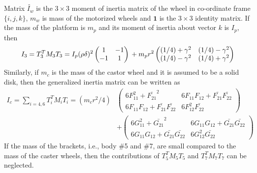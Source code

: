 Matrix $\tilde{I_w}$ is the $3\times 3$ moment of inertia matrix of the wheel in co-ordinate frame $\{i,j,k\}$, $m_w$ is mass of the motorized wheels    and $\bm{1}$ is the $3\times 3$ identity matrix. If the mass of the platform is $m_p$ and its moment of inertia about vector ${k}$ is $I_p$, then  \cite{angeles2013fundamentals} 
\begin{equation}
\label{eqn:I_platform}
I_3=T^T_3M_3T_3 =I_p(\rho\delta)^2\begin{pmatrix}
1&-1\\-1&1 \end{pmatrix}\\
+m_pr^2\begin{pmatrix}
(1/4)+\gamma^2 & (1/4)-\gamma^2\\(1/4)-\gamma^2 & (1/4)+\gamma^2
\end{pmatrix}
\end{equation}
Similarly, if $m_c$ is the mass of the castor wheel and it is assumed to be a solid disk, then the generalized inertia matrix  can be written as
\begin{align}
I_c=\sum_{i=4,6}T^T_iM_iT_i=(m_cr^2/4)&
\begin{pmatrix}
6F_{11}^2+\bar{F_{21}}^2 & 6F_{11}F_{12}+\bar{F_{21}}\bar{F_{22}}\\
6F_{11}F_{12}+\bar{F_{21}}\bar{F_{22}} & 6F_{12}^2\bar{F_22}
\end{pmatrix}\\ \nonumber
&+\begin{pmatrix}
6G_{11}^2+\bar{G_{21}}^2 & 6G_{11}G_{12}+\bar{G_{21}}\bar{G_{22}}\\
6G_{11}G_{12}+\bar{G_{21}}\bar{G_{22}} & 6G_{12}^2\bar{G_22}
\end{pmatrix}
\end{align}
If the mass of the brackets, i.e., body \#5 and \#7, are small compared to the mass of the caster wheels, then the contributions of $T^T_5M_5T_5$ and $T^T_7M_7T_7$ can be neglected.


